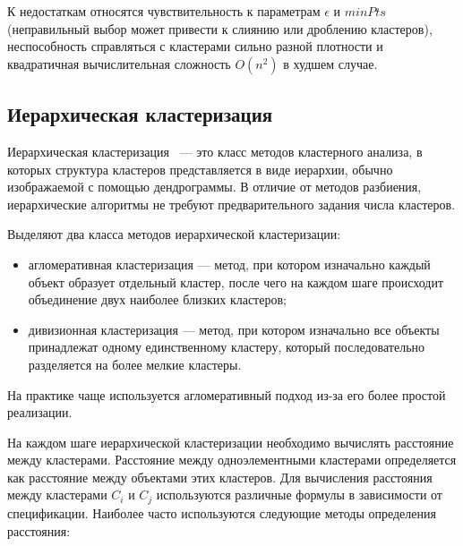 К недостаткам относятся чувствительность к параметрам $\epsilon$ и $minPts$ (неправильный выбор может привести к слиянию или дроблению кластеров), неспособность справляться с кластерами сильно разной плотности и квадратичная вычислительная сложность $O(n^2)$ в худшем случае.


\subsection{Иерархическая кластеризация}

Иерархическая кластеризация~\cite{ierarh} --- это класс методов кластерного анализа, в которых структура кластеров представляется в виде иерархии, обычно изображаемой с помощью дендрограммы. В отличие от методов разбиения, иерархические алгоритмы не требуют предварительного задания числа кластеров.

Выделяют два класса методов иерархической кластеризации:
\begin{itemize}
	\item[---] агломеративная кластеризация --- метод, при котором изначально каждый объект образует отдельный кластер, после чего на каждом шаге происходит объединение двух наиболее близких кластеров;
	\item[---] дивизионная кластеризация --- метод, при котором изначально все объекты принадлежат одному единственному кластеру, который последовательно разделяется на более мелкие кластеры.
\end{itemize}

На практике чаще используется агломеративный подход из-за его более простой реализации.

На каждом шаге иерархической кластеризации необходимо вычислять расстояние между кластерами. Расстояние между одноэлементными кластерами определяется как расстояние между объектами этих кластеров. Для вычисления расстояния между кластерами $C_i$ и $C_j$ используются различные формулы в зависимости от спецификации. Наиболее часто используются следующие методы определения расстояния:

